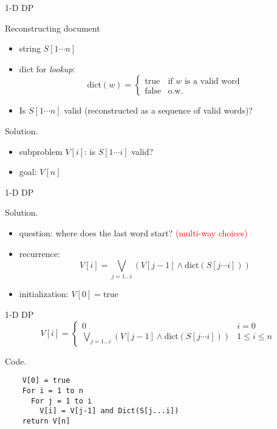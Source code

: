 \begin{frame}{1-D DP}
  \begin{exampleblock}{Reconstructing document }
    \begin{itemize}
      \item string $S[1 \cdots n]$
      \item dict for \emph{lookup}:
	\begin{displaymath}
	  \text{dict}(w) = \left\{ \begin{array}{ll}
	    \text{true} & \textrm{if } w \textrm{ is a valid word}\\
	    \text{false} & \textrm{o.w.}
	  \end{array} \right.
	\end{displaymath}
      \item Is $S[1 \cdots n]$ valid (reconstructed as a sequence of valid words)?
    \end{itemize}
  \end{exampleblock}

  \begin{block}{Solution.}
    \begin{itemize}
      \item subproblem $V[i]$: is $S[1 \cdots i]$ valid?
      \item goal: $V[n]$
    \end{itemize}
  \end{block}
\end{frame}
\begin{frame}{1-D DP}
  \begin{block}{Solution.}
    \begin{itemize}
      \item question: where does the last word start? {\footnotesize \textcolor{red}{(multi-way choices)}}
      \item recurrence: 
	\[ 
	  V[i] = \bigvee_{j = 1 \ldots i} (V[j-1] \land \text{dict}(S[j \cdots i]))
	\]
      \item initialization: $V[0] = \text{true}$
    \end{itemize}
  \end{block}
\end{frame}
\begin{frame}[fragile]{1-D DP}
    \begin{displaymath}
      V[i] = \left\{ \begin{array}{ll}
	0 & i = 0 \\
	\bigvee_{j = 1 \ldots i} (V[j-1] \land \text{dict}(S[j \cdots i])) & 1 \le i \le n
      \end{array} \right.
    \end{displaymath}

  \begin{block}{Code.}
    \begin{verbatim}
    V[0] = true
    For i = 1 to n
      For j = 1 to i
        V[i] = V[j-1] and Dict(S[j...i])
    return V[n]
    \end{verbatim}
  \end{block}
\end{frame}
